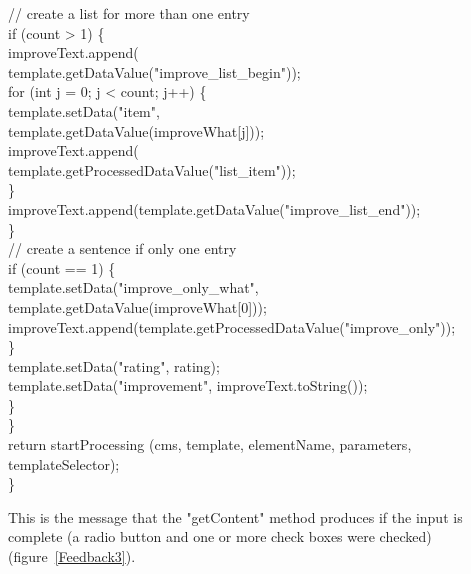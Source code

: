 \begin{java}
\jtabc                        // create a list for more than one entry\\
\jtabc                        if (count > 1) \{\\
\jtabd                           improveText.append(\\
\jtabf                  template.getDataValue("improve\_list\_begin"));\\
\jtabd                           for (int j = 0; j < count; j++) \{\\
\jtabd                             template.setData("item",\\ 
\jtabf                  template.getDataValue(improveWhat[j]));\\
\jtabe                             improveText.append(\\
\jtabf                  template.getProcessedDataValue("list\_item"));\\
\jtabd                          \}\\
\jtabd                improveText.append(template.getDataValue("improve\_list\_end"));\\
\jtabc                        \}\\
\jtabc                        // create a sentence if only one entry\\
\jtabc                        if (count == 1) \{\\
\jtabd              template.setData("improve\_only\_what",\\
\jtabd              template.getDataValue(improveWhat[0]));\\
\jtabd              improveText.append(template.getProcessedDataValue("improve\_only"));\\
\jtabc                        \}\\
\jtabc                        template.setData("rating", rating);\\
\jtabc                        template.setData("improvement", improveText.toString());\\
\jtabb                \}\\
\jtaba        \}\\
\jtaba        return startProcessing (cms, template, elementName, parameters, templateSelector);\\
\}\\
\end{java}

This is the message that the {\meth "getContent"} method produces if the input
is complete (a radio button and one or more check boxes were checked)
(figure~\ref{Feedback3}).

